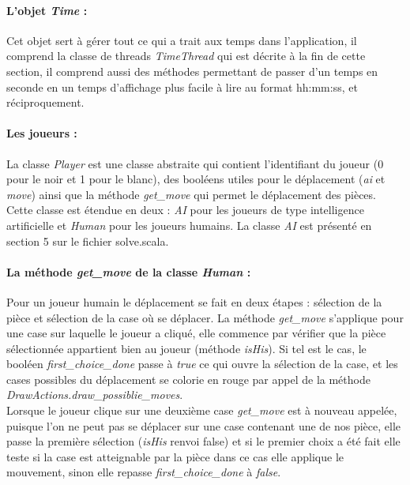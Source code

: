 \documentclass[a4paper]{article}
\begin{document}
\paragraph{L'objet \textit{Time} :}Cet objet sert à gérer tout ce qui a trait aux temps dans l'application, il comprend la classe de threads \textit{TimeThread} qui est décrite à la fin de cette section, il comprend aussi des méthodes permettant de passer d'un temps en seconde en un temps d'affichage plus facile à lire au format hh:mm:ss, et réciproquement.

\paragraph{Les joueurs :} La classe \textit{Player} est une classe abstraite qui contient l'identifiant du joueur (0 pour le noir et 1 pour le blanc), des booléens utiles pour le déplacement (\textit{ai} et \textit{move}) ainsi que la méthode \textit{get\_move} qui permet le déplacement des pièces. \\

Cette classe est étendue en deux : \textit{AI} pour les joueurs de type intelligence artificielle et \textit{Human} pour les joueurs humains. La classe \textit{AI} est présenté en section 5 sur le fichier solve.scala. 

\paragraph{La méthode \textit{get\_move} de la classe \textit{Human} :}Pour un joueur humain le déplacement se fait en deux étapes : sélection de la pièce et sélection de la case où se déplacer. La méthode \textit{get\_move} s'applique pour une case sur laquelle le joueur a cliqué, elle commence par vérifier que la pièce sélectionnée appartient bien au joueur (méthode \textit{isHis}). Si tel est le cas, le booléen \textit{first\_choice\_done} passe à \textit{true} ce qui ouvre la sélection de la case, et les cases possibles du déplacement se colorie en rouge par appel de la méthode \textit{DrawActions.draw\_possiblie\_moves}. \\

Lorsque le joueur clique sur une deuxième case \textit{get\_move} est à nouveau appelée, puisque l'on ne peut pas se déplacer sur une case contenant une de nos pièce, elle passe la première sélection (\textit{isHis} renvoi false) et si le premier choix a été fait elle teste si la case est atteignable par la pièce dans ce cas elle applique le mouvement, sinon elle repasse \textit{first\_choice\_done} à \textit{false}. \\
\end{document}
